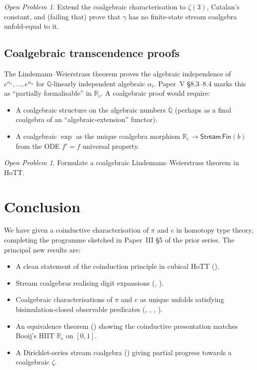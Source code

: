 \documentclass[12pt]{article}
\theoremstyle{definition}
\theoremstyle{remark}
\newtheorem{problem}[theorem]{Open Problem}
\newcommand{\Q}{\mathbb{Q}}
\newcommand{\R}{\mathbb{R}}
\newcommand{\Rc}{\R_c}
\newcommand{\Stream}{\mathsf{Stream}}
\begin{document}
\begin{problem}\label{prob:higher-trans}
Extend the coalgebraic characterisation to $\zeta(3)$, Catalan's
constant, and (failing that) prove that $\gamma$ has no
finite-state stream coalgebra unfold-equal to it.
\end{problem}

\subsection{Coalgebraic transcendence proofs}

The Lindemann--Weierstrass theorem proves the algebraic
independence of $e^{\alpha_1},\ldots,e^{\alpha_n}$ for
$\Q$-linearly independent algebraic $\alpha_i$. Paper~V
\S 8.3--8.4 marks this as ``partially formalisable'' in
$\Rc$. A coalgebraic proof would require:

\begin{itemize}
\item A coalgebraic structure on the algebraic numbers
$\overline{\Q}$ (perhaps as a final coalgebra of an
``algebraic-extension'' functor).
\item A coalgebraic $\exp$ as the unique coalgebra
morphism $\Rc \to \Stream\,\mathsf{Fin}(b)$ from the
ODE $f' = f$ universal property.
\end{itemize}

\begin{problem}\label{prob:trans-coalg}
Formulate a coalgebraic Lindemann--Weierstrass theorem in HoTT.
\end{problem}

\section{Conclusion}

We have given a coinductive characterisation of $\pi$ and $e$
in homotopy type theory, completing the programme sketched in
Paper~III \S 5 of the prior series. The principal new results are:

\begin{itemize}
\item A clean statement of the coinduction principle in cubical
HoTT ().
\item Stream coalgebras realising digit expansions
(, ).
\item Coalgebraic characterisations of $\pi$ and $e$ as unique
unfolds satisfying bisimulation-closed observable predicates
(, , ,
).
\item An equivalence theorem () showing the
coinductive presentation matches Booij's HIIT $\Rc$ on $[0,1]$.
\item A Dirichlet-series stream coalgebra ()
giving partial progress towards a coalgebraic $\zeta$.
\end{itemize}
\end{document}
